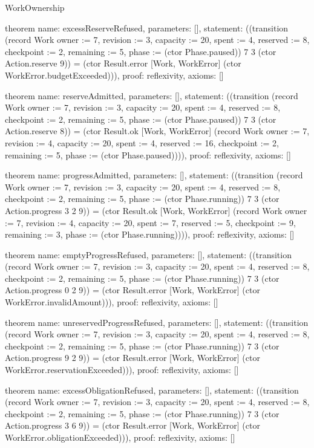 \begin{lexlean}{WorkOwnership}
\begin{semanticmodule}
theorem{
  name: excessReserveRefused,
  parameters: [],
  statement: ((transition (record Work {owner := 7, revision := 3, capacity := 20, spent := 4, reserved := 8, checkpoint := 2, remaining := 5, phase := (ctor Phase.paused)}) 7 3 (ctor Action.reserve 9)) = (ctor Result.error [Work, WorkError] (ctor WorkError.budgetExceeded))),
  proof: reflexivity{},
  axioms: []
}

theorem{
  name: reserveAdmitted,
  parameters: [],
  statement: ((transition (record Work {owner := 7, revision := 3, capacity := 20, spent := 4, reserved := 8, checkpoint := 2, remaining := 5, phase := (ctor Phase.paused)}) 7 3 (ctor Action.reserve 8)) = (ctor Result.ok [Work, WorkError] (record Work {owner := 7, revision := 4, capacity := 20, spent := 4, reserved := 16, checkpoint := 2, remaining := 5, phase := (ctor Phase.paused)}))),
  proof: reflexivity{},
  axioms: []
}

theorem{
  name: progressAdmitted,
  parameters: [],
  statement: ((transition (record Work {owner := 7, revision := 3, capacity := 20, spent := 4, reserved := 8, checkpoint := 2, remaining := 5, phase := (ctor Phase.running)}) 7 3 (ctor Action.progress 3 2 9)) = (ctor Result.ok [Work, WorkError] (record Work {owner := 7, revision := 4, capacity := 20, spent := 7, reserved := 5, checkpoint := 9, remaining := 3, phase := (ctor Phase.running)}))),
  proof: reflexivity{},
  axioms: []
}

theorem{
  name: emptyProgressRefused,
  parameters: [],
  statement: ((transition (record Work {owner := 7, revision := 3, capacity := 20, spent := 4, reserved := 8, checkpoint := 2, remaining := 5, phase := (ctor Phase.running)}) 7 3 (ctor Action.progress 0 2 9)) = (ctor Result.error [Work, WorkError] (ctor WorkError.invalidAmount))),
  proof: reflexivity{},
  axioms: []
}

theorem{
  name: unreservedProgressRefused,
  parameters: [],
  statement: ((transition (record Work {owner := 7, revision := 3, capacity := 20, spent := 4, reserved := 8, checkpoint := 2, remaining := 5, phase := (ctor Phase.running)}) 7 3 (ctor Action.progress 9 2 9)) = (ctor Result.error [Work, WorkError] (ctor WorkError.reservationExceeded))),
  proof: reflexivity{},
  axioms: []
}

theorem{
  name: excessObligationRefused,
  parameters: [],
  statement: ((transition (record Work {owner := 7, revision := 3, capacity := 20, spent := 4, reserved := 8, checkpoint := 2, remaining := 5, phase := (ctor Phase.running)}) 7 3 (ctor Action.progress 3 6 9)) = (ctor Result.error [Work, WorkError] (ctor WorkError.obligationExceeded))),
  proof: reflexivity{},
  axioms: []
}


\end{semanticmodule}
\end{lexlean}

